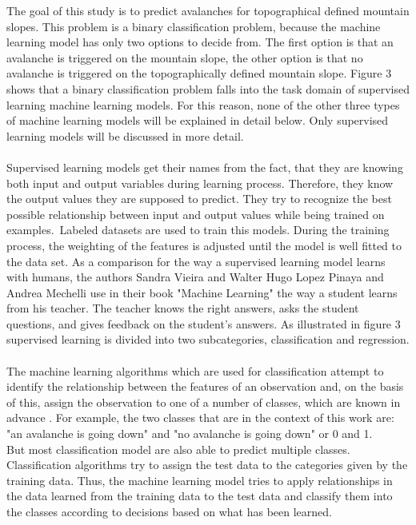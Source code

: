 \documentclass[../masterarbeit.tex]{subfiles}
\begin{document}
The goal of this study is to predict avalanches for topographical defined mountain slopes. This problem is a binary classification problem, because the machine learning model has only two options to decide from. The first option is that an avalanche is triggered on the mountain slope, the other option is that no avalanche is triggered on the topographically defined mountain slope.
Figure 3 shows that a binary classification problem falls into the task domain of supervised learning machine learning models. For this reason, none of the other three types of machine learning models will be explained in detail below. Only supervised learning models will be discussed in more detail. \\~\\
Supervised learning models get their names from the fact, that they are knowing both input and output variables during learning process. Therefore, they know the output values they are supposed to predict. They try to recognize the best possible relationship between input and output values while being trained on examples. Labeled datasets are used to train this models. During the training process, the weighting of the features is adjusted until the model is well fitted to the data set. \autocite[]{VIEIRA20201} \autocite[]{ibm-supervised-learning:2022}
As a comparison for the way a supervised learning model learns with humans, the authors Sandra Vieira and Walter Hugo Lopez Pinaya and Andrea Mechelli use in their book "Machine Learning" the way a student learns from his teacher. The teacher knows the right answers, asks the student questions, and gives feedback on the student's answers. \autocite[]{VIEIRA20201}
As illustrated in figure 3 supervised learning is divided into two subcategories, classification and regression. \\~\\
The machine learning algorithms which are used for classification attempt to identify the relationship between the features of an observation and, on the basis of this, assign the observation to one of a number of classes, which are known in advance \textcite[]{VIEIRA20201} \textcite[]{SUBASI202091}. For example, the two classes that are in the context of this work are: "an avalanche is going down" and "no avalanche is going down" or 0 and 1. \\
But most classification model are also able to predict multiple classes. Classification algorithms try to assign the test data to the categories given by the training data. Thus, the machine learning model tries to apply relationships in the data learned from the training data to the test data and classify them into the classes according to decisions based on what has been learned. \autocite[]{ibm-supervised-learning:2022}
\end{document}
